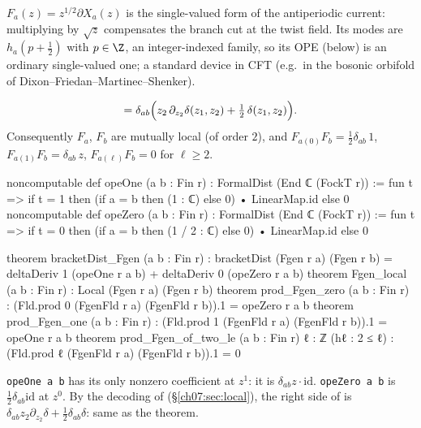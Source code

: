 \begin{physics}
$F_a(z)=z^{1/2}\partial X_a(z)$ is the single-valued form of the antiperiodic current: multiplying by $\sqrt z$ compensates the branch cut at the twist field. Its modes are $h_a(p+\tfrac12)$ with $p\in\Z$, an integer-indexed family, so its OPE (below) is an ordinary single-valued one; a standard device in CFT (e.g.\ in the bosonic orbifold of Dixon--Friedan--Martinec--Shenker).
\end{physics}

\begin{theorem}\label{ch07:thm:Fgencomm}
\begin{equation*}
  [F_a(z_1),F_b(z_2)] = \delta_{ab}\Bigl(z_2\,\partial_{z_2}\delta(z_1,z_2) +
  \tfrac12\,\delta(z_1,z_2)\Bigr).
\end{equation*}
Consequently $F_a$, $F_b$ are mutually local (of order $2$), and
$F_{a(0)}F_b = \tfrac12\delta_{ab}\,1$, $F_{a(1)}F_b = \delta_{ab}\,z$, $F_{a(\ell)}F_b = 0$ for
$\ell\ge2$.
\end{theorem}

\begin{leancode}
noncomputable def opeOne (a b : Fin r) : FormalDist (End ℂ (FockT r)) :=
  fun t => if t = 1 then (if a = b then (1 : ℂ) else 0) • LinearMap.id else 0
noncomputable def opeZero (a b : Fin r) : FormalDist (End ℂ (FockT r)) :=
  fun t => if t = 0 then (if a = b then (1 / 2 : ℂ) else 0) • LinearMap.id else 0

theorem bracketDist_Fgen (a b : Fin r) :
    bracketDist (Fgen r a) (Fgen r b)
      = deltaDeriv 1 (opeOne r a b) + deltaDeriv 0 (opeZero r a b)
theorem Fgen_local (a b : Fin r) : Local (Fgen r a) (Fgen r b)
theorem prod_Fgen_zero (a b : Fin r) :
    (Fld.prod 0 (FgenFld r a) (FgenFld r b)).1 = opeZero r a b
theorem prod_Fgen_one (a b : Fin r) :
    (Fld.prod 1 (FgenFld r a) (FgenFld r b)).1 = opeOne r a b
theorem prod_Fgen_of_two_le (a b : Fin r) {ℓ : ℤ} (hℓ : 2 ≤ ℓ) :
    (Fld.prod ℓ (FgenFld r a) (FgenFld r b)).1 = 0
\end{leancode}

\begin{dictionary}
\verb|opeOne a b| has its only nonzero coefficient at $z^1$: it is $\delta_{ab}z\cdot
\mathrm{id}$. \verb|opeZero a b| is $\frac12\delta_{ab}\mathrm{id}$ at $z^0$. By the decoding of
 (\S\ref{ch07:sec:local}), the right side of  is
$\delta_{ab}z_2\partial_{z_2}\delta + \frac12\delta_{ab}\delta$: same as the theorem.
\end{dictionary}

